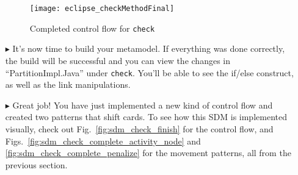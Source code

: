 \begin{itemize}
\vspace{0.5cm}

\begin{figure}[htbp]
\begin{center}
  \texttt{[image: eclipse\_checkMethodFinal]}
  \caption{Completed control flow for \texttt{check}}
  \label{fig:finalMethod}
\end{center}
\end{figure}

\item[$\blacktriangleright$] It's now time to build your metamodel. If everything was done correctly, the build will be successful and you can view the changes
in ``PartitionImpl.Java'' under \texttt{check}. You'll be able to see the if/else construct, as well as the link manipulations.

\item[$\blacktriangleright$] Great job! You have just implemented a new kind of control flow and created two patterns that shift cards. To see how
this SDM is implemented visually, check out Fig.~\ref{fig:sdm_check_finish} for the control flow, and Figs.~\ref{fig:sdm_check_complete_activity_node} and
\ref{fig:sdm_check_complete_penalize} for the movement patterns, all from the previous section.

\end{itemize}
 